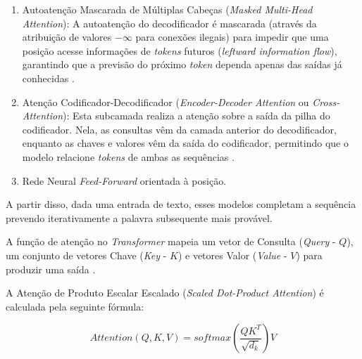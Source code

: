 \documentclass[
    12pt,                %
    openright,           %
    oneside,             %
    a4paper,             %
    english,             %
    brazil               %
]{abntex2}
\begin{document}
\begin{itemize}
\begin{enumerate}
  \item Autoatenção Mascarada de Múltiplas Cabeças (\textit{Masked Multi-Head Attention}):
A autoatenção do decodificador é mascarada (através da atribuição de valores $-\infty$ para conexões ilegais) para impedir que uma posição acesse informações de \textit{tokens} futuros (\textit{leftward information flow}), garantindo que a previsão do próximo \textit{token} dependa apenas das saídas já conhecidas \cite{vaswani2017attention, tunstall2022natural}.
  \item Atenção Codificador-Decodificador (\textit{Encoder-Decoder Attention} ou \textit{Cross-Attention}):
Esta subcamada realiza a atenção sobre a saída da pilha do codificador.
Nela, as consultas vêm da camada anterior do decodificador, enquanto as chaves e valores vêm da saída do codificador, permitindo que o modelo relacione \textit{tokens} de ambas as sequências \cite{vaswani2017attention, tunstall2022natural, jurafsky2026speech}.
  \item Rede Neural \textit{Feed-Forward} orientada à posição.
\end{enumerate}

\par
A partir disso, dada uma entrada de texto, esses modelos completam a sequência prevendo iterativamente a palavra subsequente mais provável.
\end{itemize}

\par
A função de atenção no \textit{Transformer} mapeia um vetor de Consulta (\textit{Query} - $Q$), um conjunto de vetores Chave (\textit{Key} - $K$) e vetores Valor (\textit{Value} - $V$) para produzir uma saída \cite{vaswani2017attention, tunstall2022natural}.
\par
A Atenção de Produto Escalar Escalado (\textit{Scaled Dot-Product Attention}) é calculada pela seguinte fórmula:

\begin{equation}
  Attention(Q, K, V) = softmax\left(\frac{QK^T}{\sqrt{d_k}}\right)V 
\end{equation}
\end{document}
